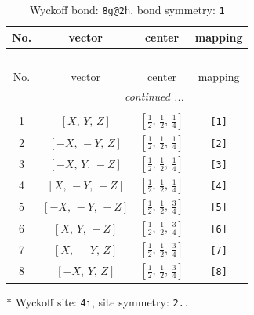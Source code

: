 \documentclass[fleqn,8pt]{jsarticle}
\begin{document}
\begin{longtable}{cccc}
\caption{Wyckoff bond: {\tt 8g@2h}, bond symmetry: {\tt 1}}
 \\
 \hline \hline
No. & vector & center & mapping \\ \hline \endfirsthead

\multicolumn{3}{l}{\tablename\ \thetable{}} \\
 \hline \hline
No. & vector & center & mapping \\ \hline \endhead

 \hline \hline
\multicolumn{3}{r}{\footnotesize\it continued ...} \\ \endfoot

 \hline \hline
\multicolumn{3}{r}{} \\ \endlastfoot

1 & $\left[ X,\, Y,\, Z \right]$ & $\left[ \frac{1}{2},\, \frac{1}{2},\, \frac{1}{4} \right]$ & {\tt [1]} \\ \hline
2 & $\left[ - X,\, - Y,\, Z \right]$ & $\left[ \frac{1}{2},\, \frac{1}{2},\, \frac{1}{4} \right]$ & {\tt [2]} \\ \hline
3 & $\left[ - X,\, Y,\, - Z \right]$ & $\left[ \frac{1}{2},\, \frac{1}{2},\, \frac{1}{4} \right]$ & {\tt [3]} \\ \hline
4 & $\left[ X,\, - Y,\, - Z \right]$ & $\left[ \frac{1}{2},\, \frac{1}{2},\, \frac{1}{4} \right]$ & {\tt [4]} \\ \hline
5 & $\left[ - X,\, - Y,\, - Z \right]$ & $\left[ \frac{1}{2},\, \frac{1}{2},\, \frac{3}{4} \right]$ & {\tt [5]} \\ \hline
6 & $\left[ X,\, Y,\, - Z \right]$ & $\left[ \frac{1}{2},\, \frac{1}{2},\, \frac{3}{4} \right]$ & {\tt [6]} \\ \hline
7 & $\left[ X,\, - Y,\, Z \right]$ & $\left[ \frac{1}{2},\, \frac{1}{2},\, \frac{3}{4} \right]$ & {\tt [7]} \\ \hline
8 & $\left[ - X,\, Y,\, Z \right]$ & $\left[ \frac{1}{2},\, \frac{1}{2},\, \frac{3}{4} \right]$ & {\tt [8]} \\
\end{longtable}
* Wyckoff site: {\tt 4i}, site symmetry: {\tt 2..}
\renewcommand{\arraystretch}{1.2}
\end{document}
